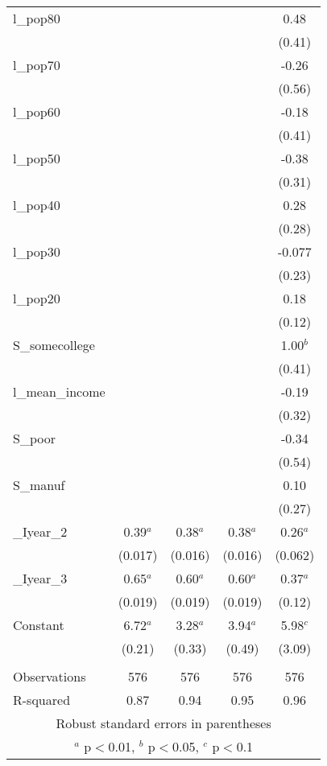 \documentclass[]{article}
\begin{document}
\begin{tabular}{lcccc}
l\_pop80 &  &  &  & 0.48 \\
 &  &  &  & (0.41) \\
l\_pop70 &  &  &  & -0.26 \\
 &  &  &  & (0.56) \\
l\_pop60 &  &  &  & -0.18 \\
 &  &  &  & (0.41) \\
l\_pop50 &  &  &  & -0.38 \\
 &  &  &  & (0.31) \\
l\_pop40 &  &  &  & 0.28 \\
 &  &  &  & (0.28) \\
l\_pop30 &  &  &  & -0.077 \\
 &  &  &  & (0.23) \\
l\_pop20 &  &  &  & 0.18 \\
 &  &  &  & (0.12) \\
S\_somecollege &  &  &  & 1.00$^b$ \\
 &  &  &  & (0.41) \\
l\_mean\_income &  &  &  & -0.19 \\
 &  &  &  & (0.32) \\
S\_poor &  &  &  & -0.34 \\
 &  &  &  & (0.54) \\
S\_manuf &  &  &  & 0.10 \\
 &  &  &  & (0.27) \\
\_Iyear\_2 & 0.39$^a$ & 0.38$^a$ & 0.38$^a$ & 0.26$^a$ \\
 & (0.017) & (0.016) & (0.016) & (0.062) \\
\_Iyear\_3 & 0.65$^a$ & 0.60$^a$ & 0.60$^a$ & 0.37$^a$ \\
 & (0.019) & (0.019) & (0.019) & (0.12) \\
Constant & 6.72$^a$ & 3.28$^a$ & 3.94$^a$ & 5.98$^c$ \\
 & (0.21) & (0.33) & (0.49) & (3.09) \\
 &  &  &  &  \\
Observations & 576 & 576 & 576 & 576 \\
 R-squared & 0.87 & 0.94 & 0.95 & 0.96 \\ \hline
\multicolumn{5}{c}{ Robust standard errors in parentheses} \\
\multicolumn{5}{c}{ $^a$ p$<$0.01, $^b$ p$<$0.05, $^c$ p$<$0.1} \\
\end{tabular}
\end{document}
